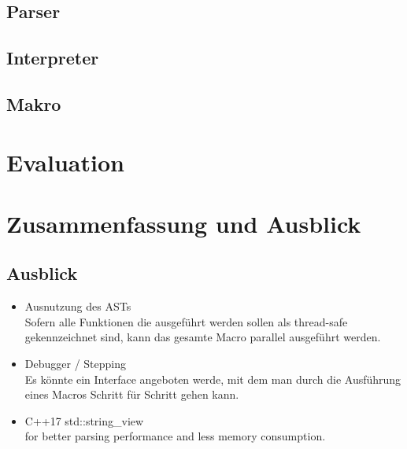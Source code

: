   \subsection{Parser}
  \label{ssec:Parser}

  \subsection{Interpreter}
  \label{ssec:Interpreter}

  \subsection{Makro}
  \label{ssec:Makro}

\section{Evaluation}
\label{sec:Evaluation}

\section{Zusammenfassung und Ausblick}
\label{sec:Zusammenfassung und Ausblick}

  \subsection{Ausblick}
  \label{sec:Ausblick}
    \begin{itemize}
      \item Ausnutzung des ASTs\\
        Sofern alle Funktionen die ausgeführt werden sollen als thread-safe gekennzeichnet sind, kann das gesamte Macro parallel ausgeführt werden.
      \item Debugger / Stepping\\
        Es könnte ein Interface angeboten werde, mit dem man durch die Ausführung eines Macros Schritt für Schritt gehen kann.
      \item C++17 std::string\_view\\
        for better parsing performance and less memory consumption.
    \end{itemize}


